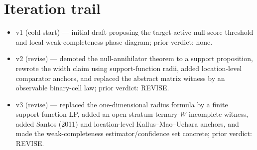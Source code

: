 \documentclass[11pt]{article}
\theoremstyle{definition}
\theoremstyle{plain}
\theoremstyle{remark}
\begin{document}
\section{Iteration trail}
\begin{itemize}[leftmargin=1.5em]
\item v1 (cold-start) --- initial draft proposing the target-active null-score
threshold and local weak-completeness phase diagram; prior verdict: none.
\item v2 (revise) --- demoted the null-annihilator theorem to a support
proposition, rewrote the width claim using support-function radii, added
location-level comparator anchors, and replaced the abstract matrix witness by
an observable binary-cell law; prior verdict: REVISE.
\item v3 (revise) --- replaced the one-dimensional radius formula by a finite
support-function LP, added an open-stratum ternary-\(W\) incomplete witness,
added Santos (2011) and location-level Kallus--Mao--Uehara anchors, and made
the weak-completeness estimator/confidence set concrete; prior verdict: REVISE.
\end{itemize}
\end{document}
